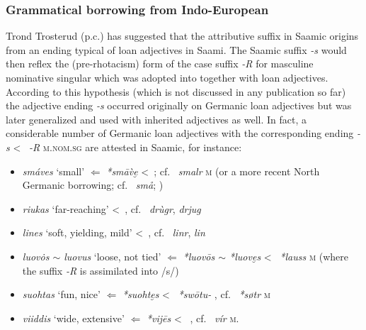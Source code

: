 {\subsubsection{Grammatical borrowing from Indo-European}
Trond Trosterud (p.c.) has suggested that the attributive suffix in Saamic origins from an ending typical of  loan adjectives in Saami. The Saamic suffix \textit{-s} would then reflex the (pre-rhotacism) form of the  case suffix \textit{-R} for masculine nominative singular which was adopted into  together with loan adjectives. According to this hypothesis (which is not discussed in any publication so far) the adjective ending \mbox{\textit{-s}} occurred originally on Germanic loan adjectives but was later generalized and used with inherited adjectives as well. In fact, a considerable number of Germanic loan adjectives with the corresponding ending \textit{-s} <~ \textit{-R} \textsc{m.nom.sg} are attested in Saamic, for instance:
\begin{itemize}
\item {} \textit{smáves} ‘small’ $\Leftarrow$  \textit{*smāv̀e̮} <~; cf.~ \textit{smalr} \textsc{m} (or a more recent North Germanic borrowing; cf.~ \textit{sm\aa}; \citealt[263]{sammallahti1998b})
\item {} \textit{riukas} ‘far-reaching’ <~, cf.~ \textit{drùgr},  \textit{drjug} \citep[267]{qvigstad1893}
\item {} \textit{lines} ‘soft, yielding, mild’ <~, cf.~ \textit{linr},  \textit{lin} \citep[218]{qvigstad1893}
\item {} \textit{luov\.{o}s $\sim$ luovus} ‘loose, not tied’ $\Leftarrow$  \textit{*luovōs $\sim$ *luove̮s} <~ \textit{*lauss} \textsc{m} (where the suffix \textit{-R} is assimilated into /s/) \citep[264]{sammallahti1998b}
\item {} \textit{suohtas} ‘fun, nice’ $\Leftarrow$  \textit{*suohte̮s} <~ \textit{*swōtu-} \citep[264]{sammallahti1998b}, cf.~ \textit{*søtr} \textsc{m} 
\item {} \textit{viiddis} ‘wide, extensive’ $\Leftarrow$  \textit{*vij{\dh}ēs} <~ \citep[148–149]{lehtiranta1989}, cf.~ \textit{v\'i{\dh}r} \textsc{m}.
\end{itemize}

}
